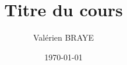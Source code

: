 \documentclass{article}
\title{Titre du cours}
\author{Valérien BRAYE}
\date{\today}
\begin{document}
  \createintro %

  

  \newpage
  \nocite{*} %
  
  
\end{document}
